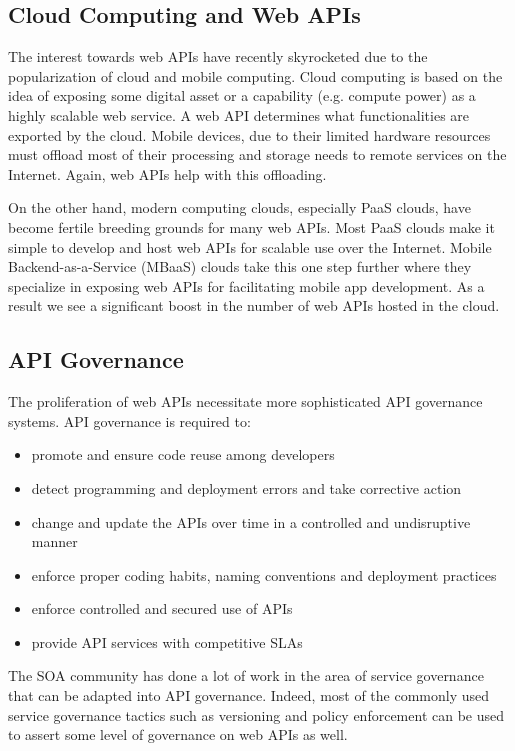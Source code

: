 \subsection{Cloud Computing and Web APIs}
The interest towards web APIs have recently skyrocketed due to the popularization of cloud and mobile computing.
Cloud computing is based on the idea of exposing some digital asset or a capability (e.g. compute power) as a highly scalable web service. A 
web API determines
what functionalities are exported by the cloud. Mobile devices, due to their limited hardware
resources must offload most of their processing and storage needs to remote services on the Internet. Again, web APIs help with this offloading. 

On the other hand, modern computing clouds, especially PaaS clouds, have become fertile breeding grounds for many web APIs. 
Most PaaS clouds make it simple to develop and host web APIs for scalable use over the Internet. Mobile 
Backend-as-a-Service (MBaaS) clouds take this one step further where they specialize in exposing web APIs for facilitating mobile
app development. As a result we see a significant boost in the number of web APIs hosted in the cloud.

\subsection{API Governance}
The proliferation of web APIs necessitate more sophisticated API governance systems. API governance is required to:
\begin{itemize}
\item promote and ensure code reuse among developers
\item detect programming and deployment errors and take corrective action
\item change and update the APIs over time in a controlled and undisruptive manner
\item enforce proper coding habits, naming conventions and deployment practices
\item enforce controlled and secured use of APIs
\item provide API services with competitive SLAs
\end{itemize}

The SOA community has done a lot of work in the area of service governance that can be adapted into
API governance. Indeed, most of the commonly used service governance tactics such as versioning and policy enforcement
can be used to assert some level of governance on web APIs as well.

